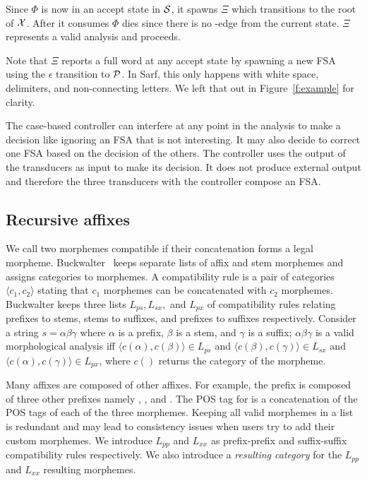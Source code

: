 \documentclass[11pt]{article}
\newcommand{\noTrRL}[1]{\transfalse\RL{#1}\transtrue}
\begin{document}
Since $\Phi$ is now in an accept state in ${\cal S}$, it 
spawns $\Xi$ which transitions to the root of ${\cal X}$. 
After it consumes  $\Phi$ dies since there is no
\noTrRL{h--}-edge from the current state.
$\Xi$ represents a valid analysis and proceeds.
       
Note that $\Xi$ reports a full word at any accept state
by spawning a new FSA using the $\epsilon$ transition
to ${\cal P}$.
In Sarf, this only happens with white space, delimiters, 
and non-connecting letters. 
We left that out in Figure~\ref{f:example} for clarity. 
       
The case-based controller can interfere at any point in the 
analysis to make a decision like ignoring an FSA that 
is not interesting. 
It may also decide to correct one FSA
based on the decision of the others. 
The controller uses the output of the transducers as input
to make its decision. 
It does not produce external output and therefore 
the three transducers with the 
controller compose an FSA.

\subsection{Recursive affixes}
\label{sec:recaffix}

We call two morphemes compatible if their concatenation
forms a legal morpheme. 
Buckwalter~ keeps separate lists 
of affix and stem morphemes and assigns categories to
morphemes. 
A compatibility rule is a pair of categories 
$\langle c_1, c_2\rangle$  stating that $c_1$ morphemes
can be concatenated with $c_2$ morphemes.
Buckwalter keeps three lists $L_{ps}, L_{sx},$ and $L_{px}$ 
of compatibility rules relating
prefixes to stems, stems to suffixes, and prefixes to suffixes
respectively. 
Consider a string $s=\alpha\beta\gamma$ where $\alpha$ is 
a prefix, $\beta$ is a stem, and $\gamma$ is a suffix;
$\alpha\beta\gamma$ is a 
valid morphological analysis iff
$\langle c(\alpha),c(\beta)\rangle \in L_{ps}$ and
$\langle c(\beta),c(\gamma)\rangle \in L_{sx}$ and
$\langle c(\alpha),c(\gamma)\rangle \in L_{px}$, where
$c()$ returns the category of the morpheme.

Many affixes are composed of other affixes. For example,
the prefix  is composed of three other prefixes
namely , , and .
The POS tag for  is a concatenation
of the POS tags of each of the three morphemes. 
Keeping all valid morphemes in a list
is redundant and may lead to consistency issues when
users try to add their custom morphemes.
We introduce $L_{pp}$ and
$L_{xx}$ as prefix-prefix and suffix-suffix 
compatibility rules respectively.
We also introduce a {\em resulting category}
for the $L_{pp}$ and  $L_{xx}$ resulting morphemes.
\end{document}
